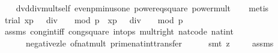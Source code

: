 \begin{isabellebody}
\ \ \isamarkupfalse%
\ dvd{\isacharunderscore}{\kern0pt}div{\isacharunderscore}{\kern0pt}mult{\isacharunderscore}{\kern0pt}self\ even{\isacharunderscore}{\kern0pt}p{\isacharunderscore}{\kern0pt}minus{\isacharunderscore}{\kern0pt}one\ power{}{\isacharunderscore}{\kern0pt}eq{\isacharunderscore}{\kern0pt}square\ power{\isacharunderscore}{\kern0pt}mult\isanewline
\ \ \isamarkupfalse%
\ {\isacharparenleft}{\kern0pt}metis{\isacharparenright}{\kern0pt}\isanewline
\ \ \isamarkupfalse%
\ \isamarkupfalse%
\ trial{\isacharcolon}{\kern0pt}\ {\isachardoublequoteopen}{\isacharbrackleft}{\kern0pt}x{\isacharcircum}{\kern0pt}{\isacharparenleft}{\kern0pt}{\isacharparenleft}{\kern0pt}p\ {\isacharminus}{\kern0pt}\ {}{\isacharparenright}{\kern0pt}\ div\ {}{\isacharparenright}{\kern0pt}\ {\isacharequal}{\kern0pt}\ {}{\isacharbrackright}{\kern0pt}\ {\isacharparenleft}{\kern0pt}mod\ p{\isacharparenright}{\kern0pt}\ {\isasymor}\ {\isacharbrackleft}{\kern0pt}x{\isacharcircum}{\kern0pt}{\isacharparenleft}{\kern0pt}{\isacharparenleft}{\kern0pt}p\ {\isacharminus}{\kern0pt}\ {}{\isacharparenright}{\kern0pt}\ div\ {}{\isacharparenright}{\kern0pt}\ {\isacharequal}{\kern0pt}\ {\isacharminus}{\kern0pt}{}{\isacharbrackright}{\kern0pt}\ {\isacharparenleft}{\kern0pt}mod\ p{\isacharparenright}{\kern0pt}{\isachardoublequoteclose}\ \isanewline
\ \ \ \ \isamarkupfalse%
\ assms{\isacharparenleft}{\kern0pt}{}{\isacharparenright}{\kern0pt}\ cong{\isacharunderscore}{\kern0pt}int{\isacharunderscore}{\kern0pt}iff\ cong{\isacharunderscore}{\kern0pt}square\ int{\isacharunderscore}{\kern0pt}ops{\isacharparenleft}{\kern0pt}{}{\isacharparenright}{\kern0pt}\ mult{\isacharunderscore}{\kern0pt}{}{\isacharunderscore}{\kern0pt}right\ nat{\isacharunderscore}{\kern0pt}code{\isacharparenleft}{\kern0pt}{}{\isacharparenright}{\kern0pt}\ nat{\isacharunderscore}{\kern0pt}int\isanewline
\ \ \ \ \ \ negative{\isacharunderscore}{\kern0pt}zle\ of{\isacharunderscore}{\kern0pt}nat{\isacharunderscore}{\kern0pt}mult\ prime{\isacharunderscore}{\kern0pt}nat{\isacharunderscore}{\kern0pt}int{\isacharunderscore}{\kern0pt}transfer\isanewline
\ \ \ \ \isamarkupfalse%
\ {\isacharparenleft}{\kern0pt}smt\ {\isacharparenleft}{\kern0pt}z{}{\isacharparenright}{\kern0pt}\ {\isacharparenright}{\kern0pt}\isanewline
\isanewline
\ \ \isamarkupfalse%
\ assms{\isacharparenleft}{\kern0pt}{}{\isacharparenright}{\kern0pt}\ \isamarkupfalse%

\end{isabellebody}
